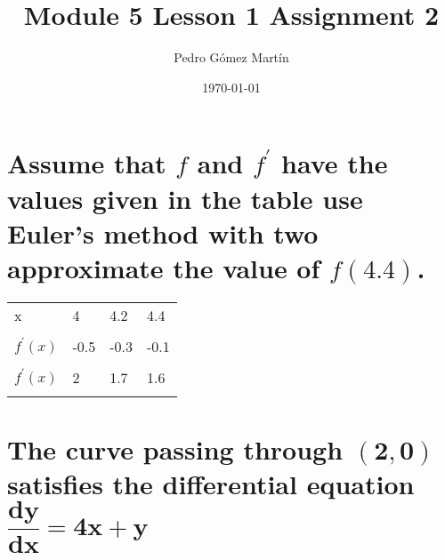 \documentclass{article}
\author{Pedro G\'{o}mez Mart\'{i}n}
\date{\today}
\title{Module 5 Lesson 1 Assignment 2}
\begin{document}
\maketitle

\section{Assume that $f$ and $f^{'}$ have the values given in the table use Euler's method with two approximate the value of $f(4.4)$.}

\begin{center}
  
  \begin{tabular}{|l|l|l|l|}
    \hline
    x & 4 & 4.2 & 4.4 \\
      & & & \\
    \hline
    $f^{'}(x)$ & -0.5 & -0.3 & -0.1 \\
      & & & \\
    \hline
    $f^{'}(x)$ & 2 & 1.7 & 1.6 \\
      & & & \\
    \hline
  \end{tabular}

\end{center}

\section{The curve passing through $\mathbf{\left( 2 , 0 \right)}$ satisfies the differential equation $\mathbf{ \dfrac{dy}{dx}=4x+y }$}
\end{document}
